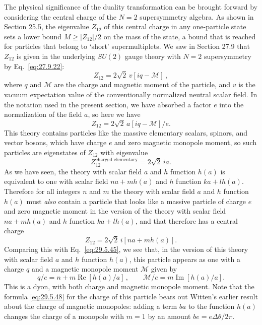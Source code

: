 The physical significance of the duality transformation can be brought
forward by considering the central charge of the \(N=2\) supersymmetry
algebra. As shown in Section 25.5, the eigenvalue \(Z_{12}\) of this central
charge in any one-particle state sets a lower bound
\(M\geq\lvert Z_{12}\rvert/2\) on the mass of the state, a bound that is
reached for particles that belong to `short' supermultiplets. We saw in
Section 27.9 that \(Z_{12}\) is given in the underlying \(SU(2)\) gauge
theory with \(N=2\) supersymmetry by Eq.~\eqref{eq:27.9.22}:
\[
  Z_{12}=2\sqrt{2}\,v[iq-\mathcal{M}]\,,
\]
where \(q\) and \(\mathcal{M}\) are the charge and magnetic moment of the
particle, and \(v\) is the vacuum expectation value of the conventionally
normalized neutral scalar field. In the notation used in the present
section, we have absorbed a factor \(e\) into the normalization of the field
\(a\), so here we have
\begin{equation}
  Z_{12}=2\sqrt{2}\,a[iq-\mathcal{M}]/e.
  \tag{29.5.45}\label{eq:29.5.45}
\end{equation}
This theory contains particles like the massive elementary scalars, spinors,
and vector bosons, which have charge \(e\) and zero magnetic monopole moment,
so such particles are eigenstates of \(Z_{12}\) with eigenvalue
\begin{equation}
  Z_{12}^{\text{charged elementary}}=2\sqrt{2}\,ia.
  \tag{29.5.46}\label{eq:29.5.46}
\end{equation}
As we have seen, the theory with scalar field \(a\) and \(h\) function
\(h(a)\) is equivalent to one with scalar field \(na+mh(a)\) and \(h\)
function \(ka+lh(a)\). Therefore for all integers \(n\) and \(m\) the theory
with scalar field \(a\) and \(h\) function \(h(a)\) must \textit{also}
contain a particle that looks like a massive particle of charge \(e\) and
zero magnetic moment in the version of the theory with scalar field
\(na+mh(a)\) and \(h\) function \(ka+lh(a)\), and that therefore has a
central charge
\begin{equation}
  Z_{12}=2\sqrt{2}\,i[na+mh(a)].
  \tag{29.5.47}\label{eq:29.5.47}
\end{equation}
Comparing this with Eq.~\eqref{eq:29.5.45}, we see that, in the version of
this theory with scalar field \(a\) and \(h\) function \(h(a)\), this
particle appears as one with a charge \(q\) and a magnetic monopole moment
\(\mathcal{M}\) given by
\begin{equation}
  q/e=n+m\operatorname{Re}[h(a)/a]\,,
  \qquad
  \mathcal{M}/e=m\operatorname{Im}[h(a)/a].
  \tag{29.5.48}\label{eq:29.5.48}
\end{equation}
This is a dyon, with both charge and magnetic monopole moment. Note that the
formula \eqref{eq:29.5.48} for the charge of this particle bears out Witten's
earlier result about the charge of magnetic monopoles: adding a term \(ba\)
to the function \(h(a)\) changes the charge of a monopole with \(m=1\) by an
amount \(be=e\Delta\theta/2\pi\).

